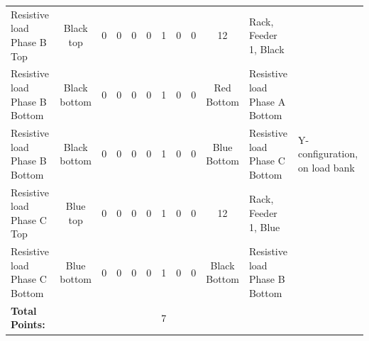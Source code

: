 \begin{table}[!htp]
{\begin{tabular}{lccccccccc@{\hspace{16pt}}l@{\hspace{16pt}}l}
			Resistive load Phase B Top            & Black top               & 0                                           & 0                                          & 0           & 0           & 1            & 0                & 0 & 12                           & Rack, Feeder 1, Black            &                               \\
			Resistive load Phase B Bottom         & Black bottom            & 0                                           & 0                                          & 0           & 0           & 1            & 0                & 0 & Red Bottom                   & Resistive load Phase A Bottom    &                               \\
			Resistive load Phase B Bottom         & Black bottom            & 0                                           & 0                                          & 0           & 0           & 1            & 0                & 0 & Blue Bottom                  & Resistive load Phase C Bottom    & Y-configuration, on load bank \\
			Resistive load Phase C Top            & Blue top                & 0                                           & 0                                          & 0           & 0           & 1            & 0                & 0 & 12                           & Rack, Feeder 1, Blue             &                               \\
			Resistive load Phase C Bottom         & Blue bottom             & 0                                           & 0                                          & 0           & 0           & 1            & 0                & 0 & Black Bottom                 & Resistive load Phase B Bottom    &                               \\ \bottomrule
			\textbf{Total Points:}                &                         &                                             &                                            &             &             & 7            &                  &   &                              &                                  &                               \\ \bottomrule
		\end{tabular}
	}
\end{table}
